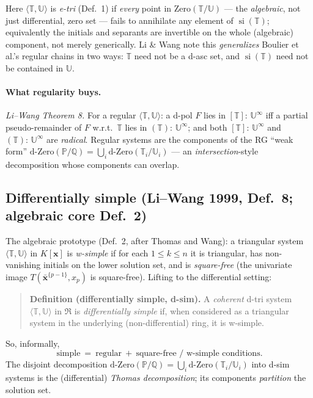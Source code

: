 \documentclass[11pt]{article}
\newcommand{\sat}[2]{[#1]\!:\!#2^{\infty}}
\newcommand{\satalg}[2]{(#1)\!:\!#2^{\infty}}
\newcommand{\si}{\operatorname{si}}
\newcommand{\dZero}{\mathrm{d\text{-}Zero}}
\newcommand{\R}{\mathfrak{R}}
\newcommand{\PP}{\mathbb{P}}
\newcommand{\TT}{\mathbb{T}}
\newcommand{\UU}{\mathbb{U}}
\begin{document}
Here $\langle\TT,\UU\rangle$ is \emph{e-tri} (Def.~1) if \emph{every} point in
$\mathrm{Zero}(\TT/\UU)$ --- the \emph{algebraic}, not just differential, zero
set --- fails to annihilate any element of $\si(\TT)$; equivalently the initials
and separants are invertible on the whole (algebraic) component, not merely
generically. Li \& Wang note this \emph{generalizes} Boulier et al.'s regular
chains in two ways: $\TT$ need not be a d-asc set, and $\si(\TT)$ need not be
contained in $\UU$.

\paragraph{What regularity buys.} \emph{Li--Wang Theorem 8.} For a regular
$\langle\TT,\UU\rangle$: a d-pol $F$ lies in $\sat{\TT}{\,\UU}$ iff a partial
pseudo-remainder of $F$ w.r.t.\ $\TT$ lies in $\satalg{\TT}{\,\UU}$; and both
$\sat{\TT}{\,\UU}$ and $\satalg{\TT}{\,\UU}$ are \emph{radical}. Regular systems
are the components of the RG ``weak form''
$\dZero(\PP/\mathbb{Q})=\bigcup_i\dZero(\TT_i/\UU_i)$ --- an
\emph{intersection}-style decomposition whose components can overlap.

\subsection{Differentially simple (Li--Wang 1999, Def.~8; algebraic core Def.~2)}

The algebraic prototype (Def.~2, after Thomas and Wang): a triangular system
$\langle\TT,\UU\rangle$ in $K[\mathbf x]$ is \emph{w-simple} if for each
$1\le k\le n$ it is triangular, has non-vanishing initials on the lower solution
set, and is \emph{square-free} (the univariate image $T(\bar{\mathbf
x}^{\{p-1\}},x_p)$ is square-free). Lifting to the differential setting:

\begin{quote}
\textbf{Definition (differentially simple, d-sim).} A \emph{coherent} d-tri
system $\langle\TT,\UU\rangle$ in $\R$ is \emph{differentially simple} if, when
considered as a triangular system in the underlying (non-differential) ring, it
is w-simple.
\end{quote}

So, informally,
\[
  \text{simple}\ =\ \text{regular}\ +\ \text{square-free / w-simple conditions}.
\]
The disjoint decomposition $\dZero(\PP/\mathbb{Q})=\bigcup_i\dZero(\TT_i/\UU_i)$
into d-sim systems is the (differential) \emph{Thomas decomposition}; its
components \emph{partition} the solution set.
\end{document}

